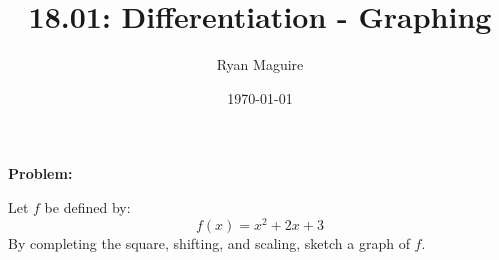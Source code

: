\documentclass{article}
\title{18.01: Differentiation - Graphing}
\author{Ryan Maguire}
\date{\today}
\newif\ifsolution
\begin{document}
    \maketitle
    \textbf{Problem:}
    \par\hfill\par
    Let $f$ be defined by:
    \[
        f(x)=x^{2}+2x+3
    \]
    By completing the square, shifting, and scaling, sketch a graph of
    $f$.
    \par\hfill\par
    \ifsolution
        \color{blue}
        \textbf{Solution:}
        \par\hfill\par
        The quadratic has no real roots. This can be verified using a bit
        of calculus. Application of the derivative shows us the smallest this
        function gets occurs at $x=-1$, and $f(-1)=2$. So we can't factor it
        with real numbers, but we can complete the square. We have:
        \[
            x^{2}+2x=(x+1)^{2}-1
        \]
        And hence:
        \[
            f(x)=x^{2}+2x+3=(x+1)^{2}+2
        \]
        We know what the graph of $y=x^{2}$ looks like, it is an ordinary
        parabola. This final formula tells us we are shifting this familiar
        image vertically \textit{upwards} by 2 and horizontally to the
        \textit{left} by 1. This creates the image below.
        \begin{figure}
            \centering
            \texttt{[image: completing\_the\_square\_and\_graphing\_002]}
            \caption{Graph of $f$}
        \end{figure}
    \fi
\end{document}
